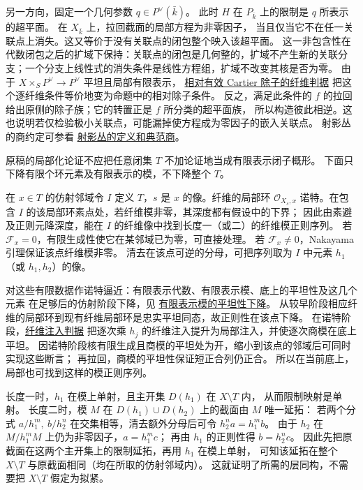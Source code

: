另一方向，固定一个几何参数 \(q\in P^\vee(\bar k)\)。
此时 \(H\) 在 \(P_{\bar k}\) 上的限制是 \(q\) 所表示的超平面。
在 \(X_{\bar k}\) 上，拉回截面的局部方程为非零因子，
当且仅当它不在任一关联点上消失。这又等价于没有关联点的闭包整个映入该超平面。
这一非包含性在代数闭包之后的扩域下保持：关联点的闭包是几何整的，扩域不产生新的关联分支；一个分支上线性式的消失条件是线性方程组，扩域不改变其核是否为零。
由于 \(X\times_S P^\vee\to P^\vee\) 平坦且局部有限表示，
\href{https://stacks.math.columbia.edu/tag/056P}{相对有效 Cartier 除子的纤维判据}
把这个逐纤维条件等价地变为命题中的相对除子条件。
反之，满足此条件的 \(f\) 的拉回给出原侧的除子族；它的转置正是 \(f\) 所分类的超平面族，
所以构造彼此相逆。这也说明若仅检验极小关联点，可能漏掉使方程成为零因子的嵌入关联点。
射影丛的商约定可参看 \href{https://stacks.math.columbia.edu/tag/01OA}{射影丛的定义和典范商}。
\par\endgroup

\begingroup
\def\depth{\operatorname{depth}}
\def\Spec{\operatorname{Spec}}
\def\OO{\mathcal O}
\def\FF{\mathcal F}
\def\JJ{\mathcal J}
\hypertarget{audit:L18-079}{}
原稿的局部化论证不应把任意闭集 \(T\) 不加论证地当成有限表示闭子概形。
下面只下降有限个环元素及有限表示的模，不下降整个 \(T\)。

在 \(x\in T\) 的仿射邻域令 \(I\) 定义 \(T\)，\(s\) 是 \(x\) 的像。纤维的局部环
\(\OO_{X_s,x}\) 诺特。在包含 \(I\) 的该局部环素点处，若纤维模非零，其深度都有假设中的下界；
因此由素避及正则元降深度，能在 \(I\) 的纤维像中找到长度一（或二）的纤维模正则序列。
若 \(\FF_x=0\)，有限生成性使它在某邻域已为零，可直接处理。
若 \(\FF_x\ne0\)，Nakayama 引理保证该点纤维模非零。
清去在该点可逆的分母，可把序列取为 \(I\) 中元素 \(h_1\)（或 \(h_1,h_2\)）的像。

对这些有限数据作诺特逼近：有限表示代数、有限表示模、底上的平坦性及这几个元素
在足够后的仿射阶段下降，见 \href{https://stacks.math.columbia.edu/tag/00R3}{有限表示模的平坦性下降}。
从较早阶段相应纤维的局部环到现有纤维局部环是忠实平坦同态，故正则性在该点下降。
在诺特阶段，\href{https://stacks.math.columbia.edu/tag/00ME}{纤维注入判据}
把逐次乘 \(h_j\) 的纤维注入提升为局部注入，并使逐次商模在底上平坦。
因诺特阶段核有限生成且商模的平坦处为开，缩小到该点的邻域后可同时实现这些断言；
再拉回，商模的平坦性保证短正合列仍正合。
所以在当前底上，局部也可找到这样的模正则序列。

长度一时，\(h_1\) 在模上单射，且主开集 \(D(h_1)\) 在 \(X\setminus T\) 内，
从而限制映射是单射。
长度二时，模 \(M\) 在 \(D(h_1)\cup D(h_2)\) 上的截面由 \(M\) 唯一延拓：
若两个分式 \(a/h_1^m,\ b/h_2^n\) 在交集相等，清去额外分母后可令 \(h_2^n a=h_1^m b\)。
由于 \(h_2\) 在 \(M/h_1^mM\) 上仍为非零因子，\(a=h_1^m c\)；
再由 \(h_1\) 的正则性得 \(b=h_2^n c\)。
因此先把原截面在这两个主开集上的限制延拓，再用 \(h_1\) 在模上单射，
可知该延拓在整个 \(X\setminus T\) 与原截面相同（均在所取的仿射邻域内）。
这就证明了所需的层同构，不需要把 \(X\setminus T\) 假定为拟紧。
\par\endgroup

